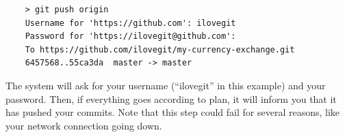 



\begin{verbatim}
    > git push origin 
    Username for 'https://github.com': ilovegit
    Password for 'https://ilovegit@github.com':
    To https://github.com/ilovegit/my-currency-exchange.git
    6457568..55ca3da  master -> master
\end{verbatim}

The system will ask for your username (``ilovegit'' in this example)
and your password. Then, if everything goes according to plan, 
it will inform you that it has pushed your commits. Note that 
this step could
fail for several reasons, like your network connection going down. 

